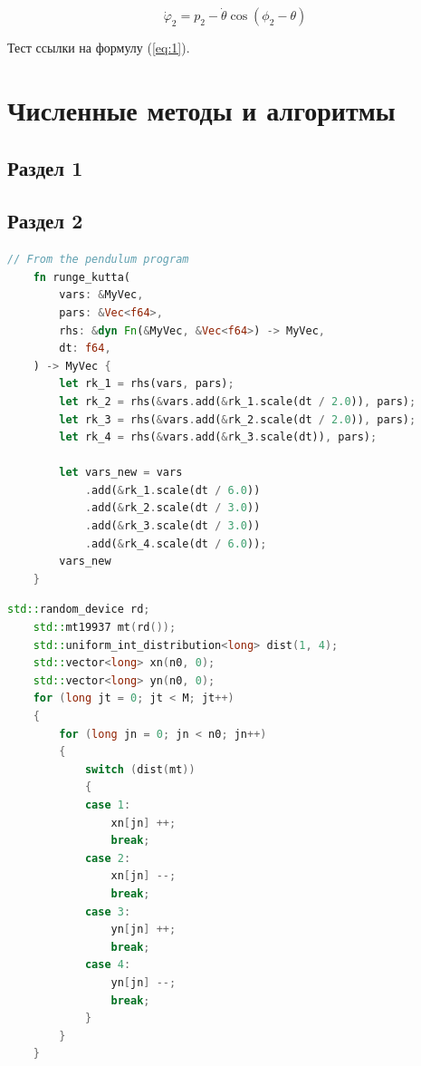 \documentclass[14pt,oneside]{extarticle}
\begin{document}
\begin{equation}
    \dot{\varphi}_{2}=p_{2}-\dot{\theta}\cos(\phi_{2}-\theta)
\end{equation}

Тест ссылки на формулу (\ref{eq:1}).

\pagebreak
\section{Численные методы и алгоритмы}

\subsection{Раздел 1}

\subsection{Раздел 2}

\begin{lstlisting}[language=rust,caption={Программная реализация метода Рунге-Кутты},label={listing-1}]
    // From the pendulum program
    fn runge_kutta(
        vars: &MyVec,
        pars: &Vec<f64>,
        rhs: &dyn Fn(&MyVec, &Vec<f64>) -> MyVec,
        dt: f64,
    ) -> MyVec {
        let rk_1 = rhs(vars, pars);
        let rk_2 = rhs(&vars.add(&rk_1.scale(dt / 2.0)), pars);
        let rk_3 = rhs(&vars.add(&rk_2.scale(dt / 2.0)), pars);
        let rk_4 = rhs(&vars.add(&rk_3.scale(dt)), pars);
    
        let vars_new = vars
            .add(&rk_1.scale(dt / 6.0))
            .add(&rk_2.scale(dt / 3.0))
            .add(&rk_3.scale(dt / 3.0))
            .add(&rk_4.scale(dt / 6.0));
        vars_new
    }
    \end{lstlisting}
    
    \begin{lstlisting}[language=C++,caption={Подпрограмма случайного блуждания на плоскости},label={listing-2}]
    std::random_device rd;
    std::mt19937 mt(rd());
    std::uniform_int_distribution<long> dist(1, 4);
    std::vector<long> xn(n0, 0);
    std::vector<long> yn(n0, 0);
    for (long jt = 0; jt < M; jt++)
    {
        for (long jn = 0; jn < n0; jn++)
        {
            switch (dist(mt))
            {
            case 1:
                xn[jn] ++;
                break;
            case 2:
                xn[jn] --;
                break;
            case 3:
                yn[jn] ++;
                break;
            case 4:
                yn[jn] --;
                break;
            }
        }
    }
\end{lstlisting}
\end{document}
